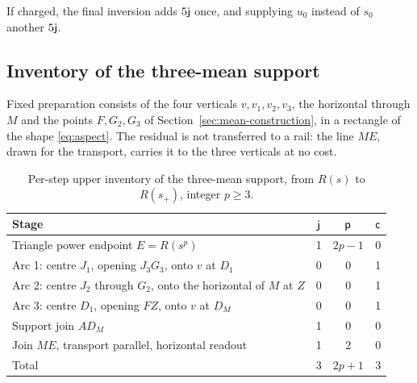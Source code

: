 If charged, the final inversion adds $5\mathsf{j}$ once, and supplying $u_0$ instead of $s_0$ another $5\mathsf{j}$.

\subsection{Inventory of the three-mean support}

Fixed preparation consists of the four verticals $v,v_1,v_2,v_3$, the horizontal through $M$ and the
points $F,G_2,G_3$ of Section~\ref{sec:mean-construction}, in a rectangle of the shape
\eqref{eq:aspect}. The residual is not transferred to a rail: the line $ME$, drawn for the transport,
carries it to the three verticals at no cost.

\begin{table}[h]
\centering\small
\caption{Per-step upper inventory of the three-mean support, from $R(s)$ to $R(s_+)$, integer
$p\ge3$.}\label{tab:mean-inventory}
\begin{tabular}{@{}lccc@{}}
\toprule
Stage & $\mathsf{j}$ & $\mathsf{p}$ & $\mathsf{c}$\\
\midrule
Triangle power endpoint $E=R(s^{p})$ & 1 & $2p-1$ & 0\\
Arc 1: centre $J_1$, opening $J_3G_3$, onto $v$ at $D_1$ & 0 & 0 & 1\\
Arc 2: centre $J_2$ through $G_2$, onto the horizontal of $M$ at $Z$ & 0 & 0 & 1\\
Arc 3: centre $D_1$, opening $FZ$, onto $v$ at $D_M$ & 0 & 0 & 1\\
Support join $AD_M$ & 1 & 0 & 0\\
Join $ME$, transport parallel, horizontal readout & 1 & 2 & 0\\
\midrule
Total & 3 & $2p+1$ & 3\\
\bottomrule
\end{tabular}
\end{table}

